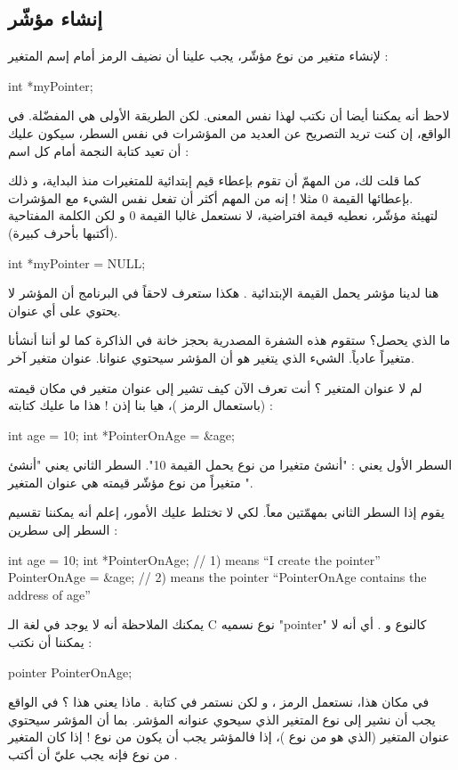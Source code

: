 \subsection{إنشاء مؤشّر}
لإنشاء متغير من نوع مؤشّر، يجب علينا أن نضيف الرمز
\InlineCode{*}
أمام إسم المتغير :
\begin{Csource}
int *myPointer;
\end{Csource}
\begin{information}
	لاحظ أنه يمكننا أيضا أن نكتب
لهذا نفس المعنى. لكن الطريقة الأولى هي المفضّلة. في الواقع، إن كنت تريد التصريح عن العديد من المؤشرات في نفس السطر، سيكون عليك أن تعيد كتابة النجمة أمام كل اسم :
\end{information}
كما قلت لك، من المهمّ أن تقوم بإعطاء قيم إبتدائية للمتغيرات منذ البداية، و ذلك بإعطائها القيمة 0 مثلا ! إنه من المهم أكثر أن تفعل نفس الشيء مع المؤشرات.\\
لتهيئة مؤشّر، نعطيه قيمة افتراضية، لا نستعمل غالبا القيمة 0 و لكن الكلمة المفتاحية
(أكتبها بأحرف كبيرة).
\begin{Csource}
int *myPointer = NULL;
\end{Csource}
هنا لدينا مؤشر يحمل القيمة الإبتدائية
.
هكذا ستعرف لاحقاً في البرنامج أن المؤشر لا يحتوي على أي عنوان.

ما الذي يحصل؟ ستقوم هذه الشفرة المصدرية بحجز خانة في الذاكرة كما لو أننا أنشأنا متغيراً عادياً. الشيء الذي يتغير هو أن المؤشر سيحتوي عنوانا. عنوان متغير آخر.

لم لا عنوان المتغير
؟ أنت تعرف الآن كيف تشير إلى عنوان متغير في مكان قيمته (باستعمال الرمز
\InlineCode{\&})،
هيا بنا إذن ! هذا ما عليك كتابته :
\begin{Csource}
int age = 10;
int *PointerOnAge = &age;
\end{Csource}
السطر الأول يعني : "أنشئ متغيرا من نوع
يحمل القيمة 10". السطر الثاني يعني "أنشئ متغيراً من نوع مؤشّر قيمته هي عنوان المتغير
".

يقوم إذا السطر الثاني بمهمّتين معاً. لكي لا تختلط عليك الأمور، إعلم أنه يمكننا تقسيم السطر إلى سطرين :
\begin{Csource}
int age = 10;
int *PointerOnAge; // 1) means “I create the pointer”
PointerOnAge = &age; // 2) means the pointer “PointerOnAge contains the address of age”
\end{Csource}
يمكنك الملاحظة أنه لا يوجد في لغة الـ
\textenglish{C}
نوع نسميه
"\textenglish{pointer}"
كالنوع
و
.
أي أنه لا يمكننا أن نكتب :
\begin{Csource}
pointer PointerOnAge;
\end{Csource}
في مكان هذا، نستعمل الرمز
\InlineCode{*}
، و لكن نستمر في كتابة
.
ماذا يعني هذا ؟ في الواقع يجب أن نشير إلى نوع المتغير الذي سيحوي عنوانه المؤشر. بما أن المؤشر
سيحتوي عنوان المتغير
(الذي هو من نوع
)،
إذا فالمؤشر يجب أن يكون من نوع
! إذا كان المتغير من نوع
فإنه يجب عليّ أن أكتب
.

